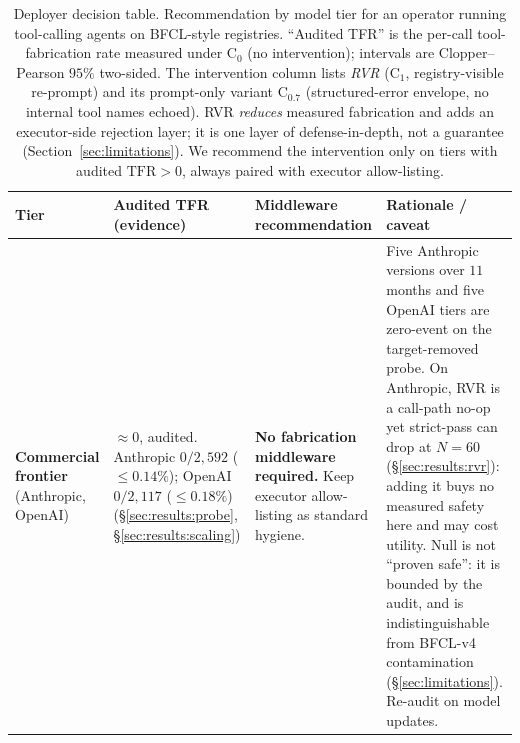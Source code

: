 \begin{table}[tb]
\caption{Deployer decision table. Recommendation by model tier for an operator
running tool-calling agents on BFCL-style registries. ``Audited TFR'' is the
per-call tool-fabrication rate measured under $\mathrm{C}_0$ (no intervention);
intervals are Clopper--Pearson $95\%$ two-sided. The intervention column lists
\emph{RVR} ($\mathrm{C}_1$, registry-visible re-prompt) and its prompt-only
variant $\mathrm{C}_{0.7}$ (structured-error envelope, no internal tool names
echoed). RVR \emph{reduces} measured fabrication and adds an executor-side
rejection layer; it is one layer of defense-in-depth, not a guarantee
(Section~\ref{sec:limitations}). We recommend the intervention only on tiers
with audited $\mathrm{TFR}\!>\!0$, always paired with executor allow-listing.}
\label{tab:deployer}
\centering
\small
\setlength{\tabcolsep}{5pt}
\renewcommand{\arraystretch}{1.25}
\begin{tabular}{p{2.5cm}p{3.0cm}p{4.3cm}p{4.3cm}}
\toprule
Tier & Audited TFR (evidence) & Middleware recommendation & Rationale / caveat \\
\midrule

\textbf{Commercial frontier} \newline (Anthropic, OpenAI) &
$\approx\!0$, audited. \newline Anthropic $0/2{,}592$ ($\leq\!0.14\%$); OpenAI
$0/2{,}117$ ($\leq\!0.18\%$) \newline (\S\ref{sec:results:probe},
\S\ref{sec:results:scaling}) &
\textbf{No fabrication middleware required.} Keep executor allow-listing as
standard hygiene. &
Five Anthropic versions over $11$ months and five OpenAI tiers are zero-event on
the target-removed probe. On Anthropic, RVR is a call-path no-op yet strict-pass
can drop at $N\!=\!60$ (\S\ref{sec:results:rvr}): adding it buys no measured
safety here and may cost utility. Null is not ``proven safe'': it is bounded
by the audit, and is indistinguishable from BFCL-v4 contamination
(\S\ref{sec:limitations}). Re-audit on model updates. \\


\end{tabular}
\end{table}
